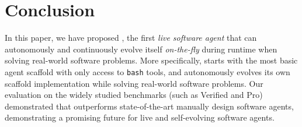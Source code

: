 \section{Conclusion}

In this paper, we have proposed \livesweagent, the first \emph{live software agent} that can autonomously and continuously evolve itself \emph{on-the-fly} during runtime when solving real-world software problems. More specifically, \livesweagent starts with the most basic agent scaffold with only access to \texttt{bash} tools, and autonomously evolves its own scaffold implementation while solving real-world software problems. 
Our evaluation on the widely studied benchmarks (such as \swebench Verified and \swebench Pro) demonstrated that \livesweagent outperforms state-of-the-art manually design software agents, demonstrating a promising future for live and self-evolving software agents.
